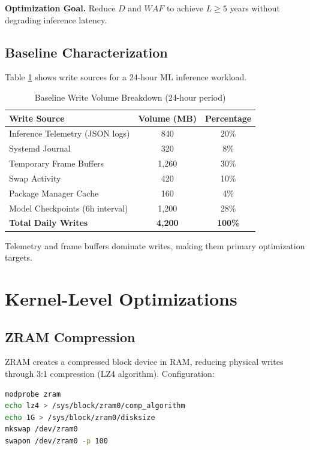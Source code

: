 \documentclass[conference]{IEEEtran}
\begin{document}
\textbf{Optimization Goal.} Reduce $D$ and $WAF$ to achieve $L \geq 5$ years without degrading inference latency.

\subsection{Baseline Characterization}

Table \ref{tab:baseline} shows write sources for a 24-hour ML inference workload.

\begin{table}[h]
\caption{Baseline Write Volume Breakdown (24-hour period)}
\begin{center}
\begin{tabular}{lcc}
\toprule
\textbf{Write Source} & \textbf{Volume (MB)} & \textbf{Percentage} \\
\midrule
Inference Telemetry (JSON logs) & 840 & 20\% \\
Systemd Journal & 320 & 8\% \\
Temporary Frame Buffers & 1,260 & 30\% \\
Swap Activity & 420 & 10\% \\
Package Manager Cache & 160 & 4\% \\
Model Checkpoints (6h interval) & 1,200 & 28\% \\
\bottomrule
\textbf{Total Daily Writes} & \textbf{4,200} & \textbf{100\%} \\
\end{tabular}
\end{center}
\label{tab:baseline}
\end{table}

Telemetry and frame buffers dominate writes, making them primary optimization targets.

\section{Kernel-Level Optimizations}

\subsection{ZRAM Compression}

ZRAM creates a compressed block device in RAM, reducing physical writes through 3:1 compression (LZ4 algorithm). Configuration:

\begin{lstlisting}[language=bash, caption={ZRAM Setup}, label={lst:zram}]
modprobe zram
echo lz4 > /sys/block/zram0/comp_algorithm
echo 1G > /sys/block/zram0/disksize
mkswap /dev/zram0
swapon /dev/zram0 -p 100
\end{lstlisting}
\end{document}
